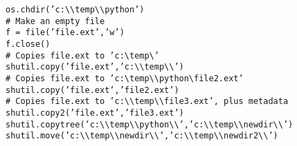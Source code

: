 \documentclass[KSmain.tex]{subfiles}
\begin{document}
\begin{framed}
	\begin{verbatim}
os.chdir(’c:\\temp\\python’)
# Make an empty file
f = file(’file.ext’,’w’)
f.close()
# Copies file.ext to ’c:\temp\’
shutil.copy(’file.ext’,’c:\\temp\\’)
# Copies file.ext to ’c:\temp\\python\file2.ext’
shutil.copy(’file.ext’,’file2.ext’)
# Copies file.ext to ’c:\\temp\\file3.ext’, plus metadata
shutil.copy2(’file.ext’,’file3.ext’)
shutil.copytree(’c:\\temp\\python\\’,’c:\\temp\\newdir\\’)
shutil.move(’c:\\temp\\newdir\\’,’c:\\temp\\newdir2\\’)

\end{verbatim}
\end{framed}
\end{document}
